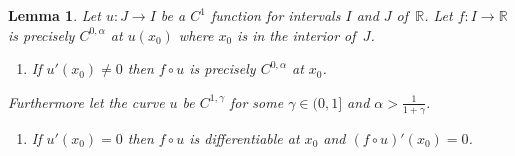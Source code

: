 \documentclass[12pt]{amsart}
\newcommand{\adj}{{precisely }} %
\numberwithin{equation}{section}
\newcommand{\R}{{\mathbb R}}		%
\newcommand{\cn}{\colon}                %
\newtheorem{lemma}[thm]{Lemma}
\theoremstyle{definition}
\theoremstyle{remark}
\begin{document}
\begin{lemma}\label{lem:fou}
  Let $u\cn J \to I$ be a $C^1$ function 
  for intervals  $I$ and $J$ of~$\R$.
Let $f\cn I \to \R$ is \adj $C^{0,\alpha}$ at $u(x_0)$
where $x_0$ is in the interior of~$J$.
\begin{enumerate}%
\item[(a)] 
  If $u'(x_0)\ne 0$ then  $f\circ u$
  is \adj $C^{0,\alpha}$ at $x_0$.
\end{enumerate}
Furthermore let the curve  $u$ be $C^{1,\gamma}$ for some $\gamma\in(0,1]$
and   $\alpha > \frac{1}{1+\gamma}$.
\begin{enumerate}
\item[(b)]
  If $u'(x_0) =0$ then $f\circ u$
  is differentiable at $x_0$ and $(f\circ u)'(x_0) =0$.
\end{enumerate}
\end{lemma}
 
\end{document}
